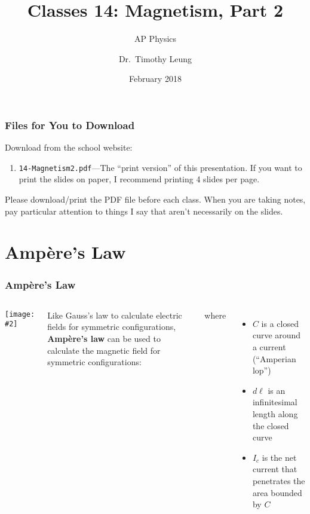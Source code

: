 \documentclass[12pt,aspectratio=169]{beamer}
\title{Classes 14: Magnetism, Part 2}
\subtitle{AP Physics}
\author[TML]{Dr.\ Timothy Leung}
\institute{Olympiads School}
\date{February 2018}
\newcommand{\pic}[2]{\texttt{[image: \#2]}}
\newcommand{\mb}[1]{\mathbf{#1}}
\newcommand{\eq}[2]{\vspace{#1}{\Large\begin{displaymath}#2\end{displaymath}}}
\begin{document}
\begin{frame}
  \maketitle
\end{frame}



\begin{frame}
  \frametitle{Files for You to Download}
  Download from the school website:
  \begin{enumerate}
  \item\texttt{14-Magnetism2.pdf}---The ``print version'' of this
    presentation. If you want to print the slides on paper, I recommend
    printing 4 slides per page.
  \end{enumerate}

  \vspace{.2in}Please download/print the PDF file before each class. When you
  are taking notes, pay particular attention to things I say that aren't
  necessarily on the slides.
\end{frame}

\section{Amp\`{e}re's Law}

\begin{frame}
  \frametitle{Amp\`{e}re's Law}
  \begin{columns}
    \pic{1}{amlaw.png}
    
    Like Gauss's law to calculate electric fields for symmetric configurations,
    \textbf{Amp\`{e}re's law} can be used to calculate the magnetic field for
    symmetric configurations:

    \eq{-.1in}{\boxed{\oint_C \mb{B}\cdot d\boldsymbol{\ell}=\mu_o I_C}}
    where
    \begin{itemize}
    \item $C$ is a closed curve around a current (``Amperian lop'')
    \item $d\boldsymbol{\ell}$ is an infinitesimal length along the closed curve
    \item $I_c$ is the net current that penetrates the area bounded by $C$
    \end{itemize}
  \end{columns}
\end{frame}
\end{document}
